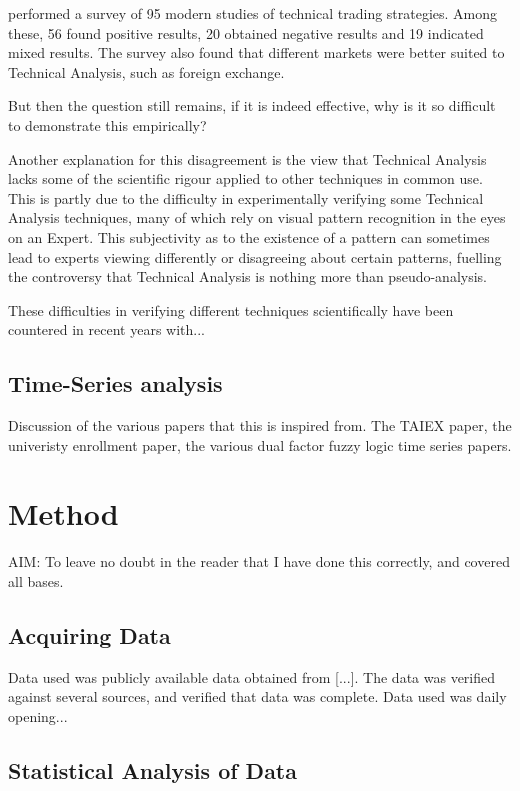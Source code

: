 \documentclass{article}
\begin{document}
\cite{taprofitability} performed a survey of 95 modern studies of technical trading strategies. Among these, 56 found positive results, 20 obtained negative results and 19 indicated mixed results. The survey also found that different markets were better suited to Technical Analysis, such as foreign exchange.

But then the question still remains, if it is indeed effective, why is it so difficult to demonstrate this empirically?

Another explanation for this disagreement is the view that Technical Analysis lacks some of the scientific rigour applied to other techniques in common use. This is partly due to the difficulty in experimentally verifying some Technical Analysis techniques, many of which rely on visual pattern recognition in the eyes on an Expert. This subjectivity as to the existence of a pattern can sometimes lead to experts viewing differently or disagreeing about certain patterns, fuelling the controversy that Technical Analysis is nothing more than pseudo-analysis.

These difficulties in verifying different techniques scientifically have been countered in recent years with...

\subsection{Time-Series analysis}

Discussion of the various papers that this is inspired from. The TAIEX paper, the univeristy enrollment paper,  the various dual factor fuzzy logic time series papers.

\section{Method}

AIM: To leave no doubt in the reader that I have done this correctly, and covered all bases.

\subsection{Acquiring Data}

Data used was publicly available data obtained from [...]. The data was verified against several sources, and verified that data was complete. Data used was daily opening...

\subsection{Statistical Analysis of Data}
\end{document}
